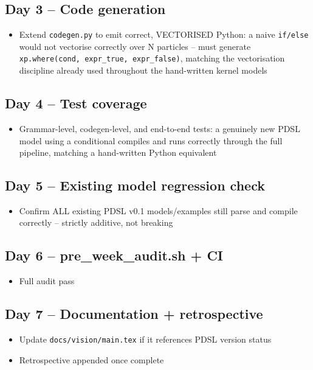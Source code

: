 \documentclass[11pt]{article}
\begin{document}
\subsection*{Day 3 -- Code generation}
\begin{itemize}[leftmargin=*]
  \item Extend \texttt{codegen.py} to emit correct, VECTORISED
    Python: a naive \texttt{if/else} would not vectorise correctly
    over N particles -- must generate \texttt{xp.where(cond,
    expr\_true, expr\_false)}, matching the vectorisation discipline
    already used throughout the hand-written kernel models
\end{itemize}

\subsection*{Day 4 -- Test coverage}
\begin{itemize}[leftmargin=*]
  \item Grammar-level, codegen-level, and end-to-end tests: a
    genuinely new PDSL model using a conditional compiles and runs
    correctly through the full pipeline, matching a hand-written
    Python equivalent
\end{itemize}

\subsection*{Day 5 -- Existing model regression check}
\begin{itemize}[leftmargin=*]
  \item Confirm ALL existing PDSL v0.1 models/examples still parse
    and compile correctly -- strictly additive, not breaking
\end{itemize}

\subsection*{Day 6 -- pre\_week\_audit.sh + CI}
\begin{itemize}[leftmargin=*]
  \item Full audit pass
\end{itemize}

\subsection*{Day 7 -- Documentation + retrospective}
\begin{itemize}[leftmargin=*]
  \item Update \texttt{docs/vision/main.tex} if it references PDSL
    version status
  \item Retrospective appended once complete
\end{itemize}
\end{document}

